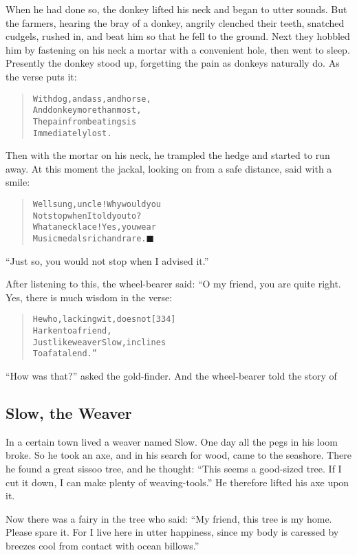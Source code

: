 \documentclass[article, twoside, 14pt]{memoir}
\newcommand{\qed}{\hfill \ensuremath{\blacksquare}}
\renewenvironment{verbatim}{%
\begin{quote}%
\vskip -10pt%
\begin{alltt}\normalfont\large}{\end{alltt}%
\end{quote}%
\vskip -10pt
} %
\begin{document}
When he had done so, the donkey lifted his neck and began to utter
sounds. But the farmers, hearing the bray of a donkey, angrily
clenched their teeth, snatched cudgels, rushed in, and beat him so
that he fell to the ground. Next they hobbled him by fastening on
his neck a mortar with a convenient hole, then went to sleep.
Presently the donkey stood up, forgetting the pain as donkeys
naturally do. As the verse puts it:

\begin{verbatim}
With dog, and ass, and horse,
    And donkey more than most,
The pain from beatings is
    Immediately lost.
\end{verbatim}
Then with the mortar on his neck, he trampled the hedge and started
to run away. At this moment the jackal, looking on from a safe
distance, said with a smile:

\begin{verbatim}
Well sung, uncle! Why would you
Not stop when I told you to?
What a necklace! Yes, you wear
Music medals rich and rare.\hyperref[s84]{\qed}
\end{verbatim}
``Just so, you would not stop when I advised it.''

After listening to this, the wheel-bearer said: “O my friend, you
are quite right. Yes, there is much wisdom in the verse:

\begin{verbatim}
He who, lacking wit, does not                           [334]
    Harken to a friend,
Just like weaver Slow, inclines
    To a fatal end.”
\end{verbatim}
``How was that?'' asked the gold-finder. And the wheel-bearer told
the story of

\subsection{Slow, the Weaver}

\label{s85}

In a certain town lived a weaver named Slow. One day all the pegs
in his loom broke. So he took an axe, and in his search for wood,
came to the seashore. There he found a great sissoo tree, and he
thought:
``This seems a good-sized tree. If I cut it down, I can make plenty of weaving-tools.''
He therefore lifted his axe upon it.

Now there was a fairy in the tree who said:
``My friend, this tree is my home. Please spare it. For I live here in utter happiness, since my body is caressed by breezes cool from contact with ocean billows.''
\end{document}
